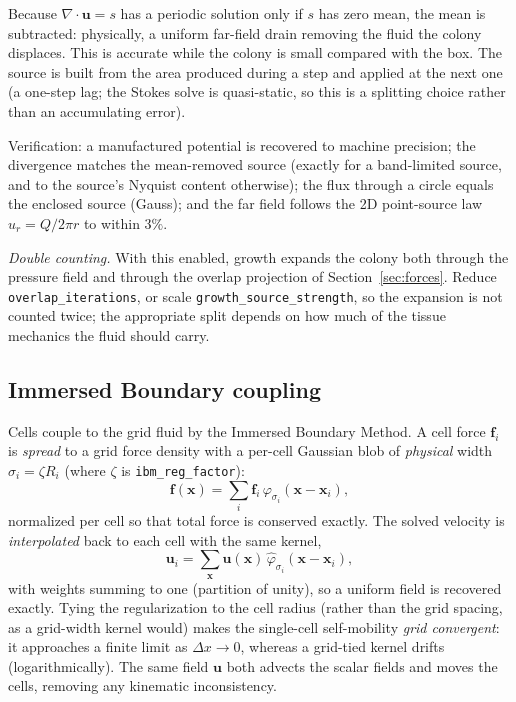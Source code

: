 \documentclass[11pt]{article}
\newcommand{\vu}{\bm{u}}
\newcommand{\vf}{\bm{f}}
\newcommand{\vx}{\bm{x}}
\newcommand{\grad}{\nabla}
\newcommand{\dx}{\Delta x}
\begin{document}
Because $\grad\cdot\vu = s$ has a periodic solution only if $s$ has zero mean,
the mean is subtracted: physically, a uniform far-field drain removing the fluid
the colony displaces. This is accurate while the colony is small compared with the
box. The source is built from the area produced during a step and applied at the
next one (a one-step lag; the Stokes solve is quasi-static, so this is a splitting
choice rather than an accumulating error).

Verification: a manufactured potential is recovered to machine precision; the
divergence matches the mean-removed source (exactly for a band-limited source, and
to the source's Nyquist content otherwise); the flux through a circle equals the
enclosed source (Gauss); and the far field follows the 2D point-source law
$u_r = Q/2\pi r$ to within $3\%$.

\emph{Double counting.} With this enabled, growth expands the colony both through
the pressure field and through the overlap projection of
Section~\ref{sec:forces}. Reduce \texttt{overlap\_iterations}, or scale
\texttt{growth\_source\_strength}, so the expansion is not counted twice; the
appropriate split depends on how much of the tissue mechanics the fluid should
carry.

\subsection{Immersed Boundary coupling}\label{sec:ibm}
Cells couple to the grid fluid by the Immersed Boundary Method. A cell force
$\vf_i$ is \emph{spread} to a grid force density with a per-cell Gaussian blob of
\emph{physical} width $\sigma_i = \zeta R_i$ (where $\zeta$ is
\texttt{ibm\_reg\_factor}):
\begin{equation}
  \vf(\vx) = \sum_i \vf_i\,\varphi_{\sigma_i}(\vx-\vx_i),
\end{equation}
normalized per cell so that total force is conserved exactly. The solved
velocity is \emph{interpolated} back to each cell with the same kernel,
\begin{equation}
  \vu_i = \sum_{\vx} \vu(\vx)\,\hat{\varphi}_{\sigma_i}(\vx-\vx_i),
\end{equation}
with weights summing to one (partition of unity), so a uniform field is
recovered exactly. Tying the regularization to the cell radius (rather than the
grid spacing, as a grid-width kernel would) makes the single-cell self-mobility
\emph{grid convergent}: it approaches a finite limit as $\dx\to 0$, whereas a
grid-tied kernel drifts (logarithmically). The same field $\vu$ both advects the
scalar fields and moves the cells, removing any kinematic inconsistency.
\end{document}
